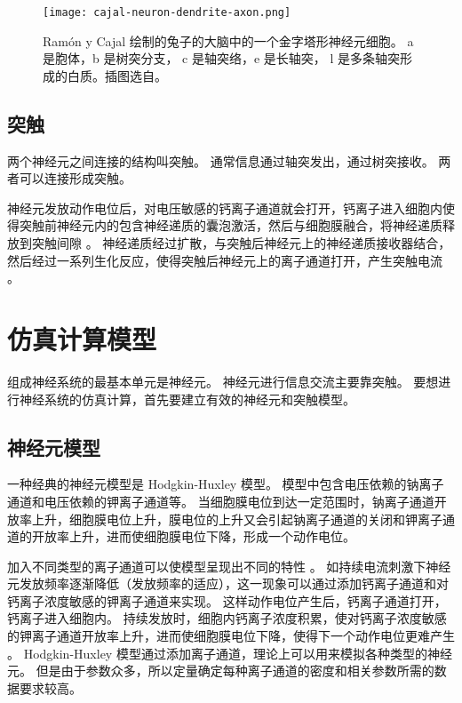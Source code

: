\begin{figure}
  \centering
  \texttt{[image: cajal-neuron-dendrite-axon.png]}
  \caption{Ramón y Cajal 绘制的兔子的大脑中的一个金字塔形神经元细胞。 a 是胞体，b 是树突分支， c 是轴突络，e 是长轴突， l 是多条轴突形成的白质。插图选自\protect{}。}
  \label{figure:cajal-neuron-dendrite-axon}
\end{figure}

\subsection{突触}
\label{section:background:synapse}
两个神经元之间连接的结构叫突触。
通常信息通过轴突发出，通过树突接收。
两者可以连接形成突触。

神经元发放动作电位后，对电压敏感的钙离子通道就会打开，钙离子进入细胞内使得突触前神经元内的包含神经递质的囊泡激活，然后与细胞膜融合，将神经递质释放到突触间隙 \cite{bear2007neuroscience,Sudhof2012}。
神经递质经过扩散，与突触后神经元上的神经递质接收器结合，然后经过一系列生化反应，使得突触后神经元上的离子通道打开，产生突触电流 \cite{bear2007neuroscience}。

\section{仿真计算模型}
\label{section:review:simulation-models}
组成神经系统的最基本单元是神经元。
神经元进行信息交流主要靠突触。
要想进行神经系统的仿真计算，首先要建立有效的神经元和突触模型。

\subsection{神经元模型}
\label{section:review:neuron-models}
一种经典的神经元模型是 Hodgkin-Huxley 模型。
模型中包含电压依赖的钠离子通道和电压依赖的钾离子通道等。
当细胞膜电位到达一定范围时，钠离子通道开放率上升，细胞膜电位上升，膜电位的上升又会引起钠离子通道的关闭和钾离子通道的开放率上升，进而使细胞膜电位下降，形成一个动作电位。

加入不同类型的离子通道可以使模型呈现出不同的特性 \cite{Gerstner2002}。
如持续电流刺激下神经元发放频率逐渐降低（发放频率的适应），这一现象可以通过添加钙离子通道和对钙离子浓度敏感的钾离子通道来实现。
这样动作电位产生后，钙离子通道打开，钙离子进入细胞内。
持续发放时，细胞内钙离子浓度积累，使对钙离子浓度敏感的钾离子通道开放率上升，进而使细胞膜电位下降，使得下一个动作电位更难产生 \cite{Gerstner2002}。
Hodgkin-Huxley 模型通过添加离子通道，理论上可以用来模拟各种类型的神经元。
但是由于参数众多，所以定量确定每种离子通道的密度和相关参数所需的数据要求较高。

